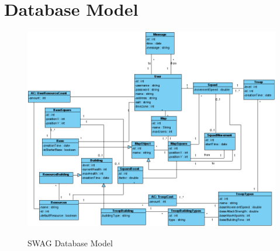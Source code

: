 \documentclass[a4paper]{article}
\begin{document}
\clearpage


\section{Database Model}

\begin{figure}[ht!]
  \begin{center}
  \hspace*{-90pt}
  \includegraphics[scale=0.55]{fig/database_model.png}
  \label{fig:database_model}
	\caption{SWAG Database Model}
  \end{center}
\end{figure}

\hspace{0pt}

%
%
\end{document}
